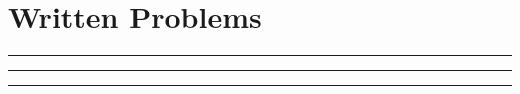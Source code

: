 \documentclass{article}
\begin{document}


\section*{Written Problems}
\noindent\rule{\textwidth}{1pt}\vspace{0.75mm}


\noindent\rule{\textwidth}{1pt}\vspace{0.75mm}


\noindent\rule{\textwidth}{1pt}\vspace{0.75mm}

\end{document}
